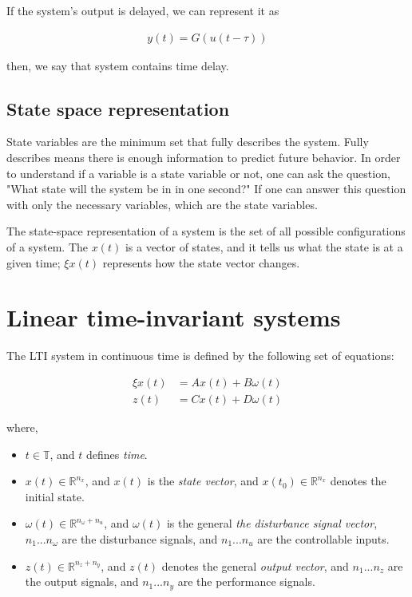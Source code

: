 If the system's output is delayed, we can represent it as

\begin{align}
	y(t) = G(u(t - \tau))
\end{align}

then, we say that system contains time delay.

\subsection{State space representation}
\label{subsec_state_space_representaion}

State variables are the minimum set that fully describes the system. Fully describes means there is enough information to predict future behavior. In order to understand if a variable is a state variable or not, one can ask the question, "What state will the system be in in one second?" If one can answer this question with only the necessary variables, which are the state variables.

The state-space representation of a system is the set of all possible configurations of a system. The $x(t)$ is a vector of states, and it tells us what the state is at a given time; $\xi x(t)$ represents how the state vector changes.


\section{Linear time-invariant systems} 
\label{sec_linear_time_invariant_systems}

The LTI system in continuous time is defined by the following set of equations:

\begin{subequations} \label{ss_lti}
	\begin{align}
		\xi x(t) &= A x(t) + B \omega(t) 
		\\
		z(t) &= C x(t) + D \omega(t)
	\end{align}
\end{subequations}

where,

\begin{itemize}
	\item $t \in \mathbb{T}$, and $t$ defines \textit{time}.
	\item $x(t) \in \mathbb{R}^{n_x}$, and $x(t)$ is the \textit{state vector}, and
	$x(t_0) \in \mathbb{R}^{n_x}$ denotes the initial state.
	\item $\omega(t) \in \mathbb{R}^{n_\omega + n_u}$, and 
	$\omega(t)$ is the general \textit{the disturbance signal vector}, 
	$n_1 ... n_\omega$ are the disturbance signals, and 
	$n_1 ... n_u$ are the controllable inputs.
	\item $z(t) \in \mathbb{R}^{n_z + n_y}$, and 
	$z(t)$ denotes the general \textit{output vector}, and 
	$n_1 ... n_z$ are the output signals, and 
	$n_1 ... n_y$ are the performance signals.
\end{itemize}

